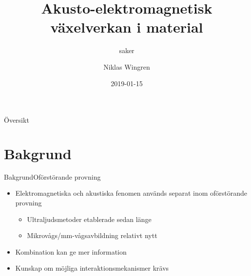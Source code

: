 \documentclass[11pt]{beamer}
\begin{document}
	
	\newcommand{\mrm}[1]{\mathrm{#1}}
	\newcommand{\eu}{\mrm{e}}
	\newcommand{\iu}{\mrm{i}}	
	
	\author{Niklas Wingren}
	\title[Akusto-elektromagnetisk växelverkan]{Akusto-elektromagnetisk växelverkan i material}
	\subtitle{saker}
	\date{2019-01-15}
	\frame[plain]{\maketitle}
	
	\begin{frame}{Översikt}
		\tableofcontents
	\end{frame}
	
	
	\section{Bakgrund}
	
	\begin{frame}{Bakgrund}{Oförstörande provning}
		\begin{itemize}
			\item Elektromagnetiska och akustiska fenomen används separat inom oförstörande provning
			\begin{itemize}
				\pause
				\item Ultraljudsmetoder etablerade sedan länge
				\pause
				\item Mikrovågs/mm-vågsavbildning relativt nytt
			\end{itemize}
			\pause
			\item Kombination kan ge mer information
			\pause
			\item Kunskap om möjliga interaktionsmekanismer krävs
		\end{itemize}
	\end{frame}
	
\end{document}
